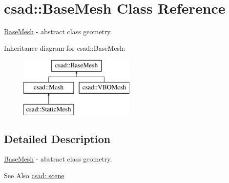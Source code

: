 \hypertarget{classcsad_1_1_base_mesh}{\section{csad\-:\-:Base\-Mesh Class Reference}
\label{classcsad_1_1_base_mesh}
}


\hyperlink{classcsad_1_1_base_mesh}{Base\-Mesh} -\/ abstract class geometry.  


Inheritance diagram for csad\-:\-:Base\-Mesh\-:\begin{figure}[H]
\begin{center}
\leavevmode
\includegraphics[height=3.000000cm]{classcsad_1_1_base_mesh}
\end{center}
\end{figure}


\subsection{Detailed Description}
\hyperlink{classcsad_1_1_base_mesh}{Base\-Mesh} -\/ abstract class geometry. 

\begin{DoxySeeAlso}{See Also}
\hyperlink{group__scene}{csad\-: scene} 
\end{DoxySeeAlso}
